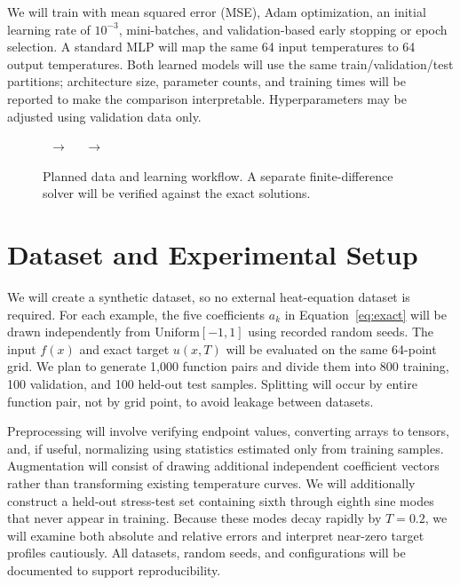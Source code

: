 \documentclass{article}
\begin{document}
We will train with mean squared error (MSE), Adam optimization, an initial learning rate of $10^{-3}$, mini-batches, and validation-based early stopping or epoch selection. A standard MLP will map the same 64 input temperatures to 64 output temperatures. Both learned models will use the same train/validation/test partitions; architecture size, parameter counts, and training times will be reported to make the comparison interpretable. Hyperparameters may be adjusted using validation data only.

\begin{figure}[t]
\centering
\setlength{\fboxsep}{5pt}
\ $\longrightarrow$\ 
\ $\longrightarrow$\ 
\caption{Planned data and learning workflow. A separate finite-difference solver will be verified against the exact solutions.}
\label{fig:workflow}
\end{figure}

\section{Dataset and Experimental Setup}
We will create a synthetic dataset, so no external heat-equation dataset is required. For each example, the five coefficients $a_k$ in Equation~\eqref{eq:exact} will be drawn independently from $\mathrm{Uniform}[-1,1]$ using recorded random seeds. The input $f(x)$ and exact target $u(x,T)$ will be evaluated on the same 64-point grid. We plan to generate 1,000 function pairs and divide them into 800 training, 100 validation, and 100 held-out test samples. Splitting will occur by entire function pair, not by grid point, to avoid leakage between datasets.

Preprocessing will involve verifying endpoint values, converting arrays to tensors, and, if useful, normalizing using statistics estimated only from training samples. Augmentation will consist of drawing additional independent coefficient vectors rather than transforming existing temperature curves. We will additionally construct a held-out stress-test set containing sixth through eighth sine modes that never appear in training. Because these modes decay rapidly by $T=0.2$, we will examine both absolute and relative errors and interpret near-zero target profiles cautiously. All datasets, random seeds, and configurations will be documented to support reproducibility.
\end{document}
